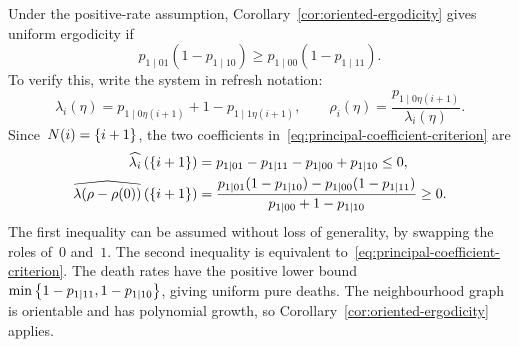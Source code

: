 Under the positive-rate assumption,
Corollary~\ref{cor:oriented-ergodicity} gives uniform ergodicity if
\begin{equation}
\label{eq:simple-positive-rates-criterion}
p_{1\mid01}(1-p_{1\mid10})
\geq p_{1\mid00}(1-p_{1\mid11}).
\end{equation}
%
%
%
To verify this, write the system in refresh notation:
\begin{equation*}
\lambda_i(\eta)=p_{1\mid0\eta(i+1)}+1-p_{1\mid1\eta(i+1)},
\qquad
\rho_i(\eta)=\frac{p_{1\mid0\eta(i+1)}}{\lambda_i(\eta)}.
\end{equation*}
Since~$N(i)=\left\{i+1\right\}$, the two coefficients
in~\eqref{eq:principal-coefficient-criterion} are
\begin{align*}
\widehat{\lambda_i}\left(\left\{i+1\right\}\right)
&=p_{1\mid01}-p_{1\mid11}-p_{1\mid00}+p_{1\mid10}\leq 0,\\
\widehat{\lambda(\rho-\rho(0))}\left(\left\{i+1\right\}\right)
&=\frac{p_{1\mid01}(1-p_{1\mid10})-p_{1\mid00}(1-p_{1\mid11})}
{p_{1\mid00} + 1 -p_{1\mid10}}\geq0.
\end{align*}
The first inequality can be assumed without loss of generality, by swapping the roles of~$0$ and~$1$. The second inequality is equivalent to~\eqref{eq:principal-coefficient-criterion}.  The death rates have
the positive lower bound~$\min\left\{1-p_{1\mid11},1-p_{1\mid10}\right\}$, giving
uniform pure deaths. The neighbourhood graph is orientable and has
polynomial growth, so Corollary~\ref{cor:oriented-ergodicity} applies.

